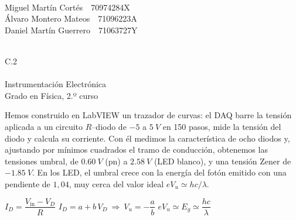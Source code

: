 \documentclass[10pt,a4paper]{article}
\begin{document}
\noindent
\vspace{0.55cm}

\noindent
\begin{minipage}[t]{0.62\linewidth}
  {\color{azul}\small{}}\\[3pt]
  {\large Miguel Martín Cortés}\ \ {\small\color{grisazul}70974284X}\\[1pt]
  {\large Álvaro Montero Mateos}\ \ {\small\color{grisazul}71096223A}\\[1pt]
  {\large Daniel Martín Guerrero}\ \ {\small\color{grisazul}71063727Y}
\end{minipage}%
\begin{minipage}[t]{0.38\linewidth}
  {\color{azul}\small{}}\\[3pt]
  {\large C.2}\\[6pt]
  {\color{azul}\small{}}\\[3pt]
  {\large Instrumentación Electrónica}\\
  {\small\color{grisazul}Grado en Física, 2.º curso}
\end{minipage}
\par\vspace{0.55cm}

\noindent
\begin{tcolorbox}[enhanced,sharp corners,boxrule=0pt,frame hidden,
  borderline west={2.2pt}{0pt}{navy},
  interior style={left color=azulclaro,right color=white},
  left=9pt,right=8pt,top=6pt,bottom=6pt,width=\linewidth]
  {\color{navy}}\par\vspace{3pt}
  \small
  Hemos construido en LabVIEW un trazador de curvas: el DAQ barre la tensión
  aplicada a un circuito $R$--diodo de $-5$ a $\SI{5}{V}$ en 150 pasos, mide
  la tensión del diodo y calcula su corriente. Con él medimos la característica
  de ocho diodos y, ajustando por mínimos cuadrados el tramo de conducción,
  obtenemos las tensiones umbral, de $\SI{0.60}{V}$ (pn) a $\SI{2.58}{V}$
  (LED blanco), y una tensión Zener de $\SI{-1.85}{V}$. En los LED, el umbral
  crece con la energía del fotón emitido con una pendiente de $1{,}04$, muy
  cerca del valor ideal $eV_u\simeq hc/\lambda$.
\end{tcolorbox}
\par{}\vspace{8pt}
\noindent\hfill
$I_D=\dfrac{V_{\text{in}}-V_D}{R}$\hfill
$I_D=a+b\,V_D\ \Rightarrow\ V_u=-\dfrac{a}{b}$\hfill
$eV_u\simeq E_g\simeq\dfrac{hc}{\lambda}$\hfill\null
\par{}
\end{document}
